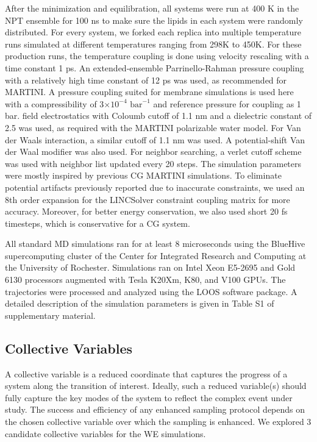 \documentclass{biophys-new}
\providecommand{\DIFaddtex}[1]{{\protect\color{blue}\uwave{#1}}} %
\providecommand{\DIFaddbegin}{} %
\providecommand{\DIFaddend}{} %
\providecommand{\DIFadd}[1]{\texorpdfstring{\DIFaddtex{#1}}{#1}} %
\newcommand{\DIFaddincludegraphics}[2][]{{\color{blue}\fbox{\DIFOincludegraphics[#1]{#2}}}} %
\DeclareRobustCommand{\DIFaddbegin}{\DIFOaddbegin \let\includegraphics\DIFaddincludegraphics} %
\DeclareRobustCommand{\DIFaddend}{\DIFOaddend \let\includegraphics\DIFOincludegraphics} %
\begin{document}
After the minimization and equilibration, all systems were run at 400 K in the NPT ensemble for 100 ns to make sure the lipids in each system were randomly distributed.
For every system, we forked each replica into multiple temperature runs simulated at different temperatures ranging from 298K to 450K.
For these production runs, the temperature coupling is done using velocity rescaling\cite{Bussi2007} with a time constant 1 ps.
An extended-ensemble Parrinello-Rahman pressure coupling\cite{Parrinello1981} with a relatively high time constant of 12 ps was used, as recommended for MARTINI.  A  \DIFaddbegin \DIFadd{semi-isotropic }\DIFaddend pressure coupling suited for membrane simulations is used here with a compressibility of 3$\times 10^{-4}$ $\text{bar}^{-1}$ and reference pressure for coupling as 1 bar.
 \DIFaddbegin \DIFadd{Reaction }\DIFaddend field electrostatics with \DIFaddbegin \DIFadd{a }\DIFaddend Coloumb cutoff of 1.1 nm  and a dielectric constant of 2.5 was used, as required with the MARTINI polarizable water model.
For Van der Waals interaction, a similar cutoff of 1.1 nm was used.
A potential-shift Van der Waal modifier was also used.
For neighbor searching, a verlet cutoff scheme was used with neighbor list updated every 20 steps.
The simulation parameters were mostly inspired by previous CG MARTINI simulations\cite{DeJong2016}.
To eliminate potential artifacts previously reported due to inaccurate constraints\cite{Javanainen2020}, we used an 8th order expansion for the LINCSolver constraint coupling matrix\cite{Hess1997} for more accuracy.
Moreover, for better energy conservation, we also used short 20 fs timesteps, which is conservative for a CG system.

All standard MD simulations ran for at least 8 microseconds using the BlueHive supercomputing cluster of the Center for Integrated Research and Computing at the University of Rochester.
Simulations ran on Intel Xeon E5-2695 and Gold 6130 processors augmented with Tesla K20Xm, K80, and V100 GPUs.
The trajectories were processed and analyzed using the LOOS software package\cite{Romo2014}.
A detailed description of the simulation parameters is given in Table S1 of supplementary material.

\subsection*{Collective Variables}

A collective variable is a reduced coordinate that captures the progress of a system along the transition of interest.
Ideally, such a reduced variable(s) should fully capture the key modes of the system to reflect the complex event under study.
The success and efficiency of any enhanced sampling protocol depends on the chosen collective variable over which the sampling is enhanced\cite{Valsson2016, Yang2019b, Henin2022}.
We explored 3 candidate collective variables for the WE simulations.
\end{document}
